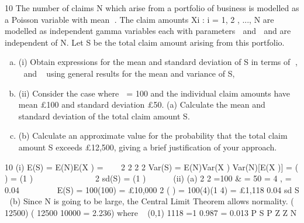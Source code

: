 \item 10 The number of claims N which arise from a portfolio of business is modelled as a
Poisson variable with mean . The claim amounts Xi : i = 1, 2 , ..., N are modelled as
independent gamma variables each with parameters  and  and are independent of
N. Let S be the total claim amount arising from this portfolio.
\begin{enumerate}[(a)]

\item (i) Obtain expressions for the mean and standard deviation of S in terms of , 
and using general results for the mean and variance of S, 
\item (ii) Consider the case where  = 100 and the individual claim amounts have mean
£100 and standard deviation £50.
(a) Calculate the mean and standard deviation of the total claim amount S.
\item (b) Calculate an approximate value for the probability that the total claim
amount S exceeds £12,500, giving a brief justification of your
approach. 
\end{enumerate}
10 (i) E(S) = E(N)E(X ) = 


2 2
2 2 Var(S) = E(N)Var(X ) Var(N)[E(X )] = ( ) = (1 )   
    
  
2
sd(S) = (1 )  


(ii) (a) 2
2 =100 & = 50 = 4 , = 0.04  
  
 
E(S) = 100(100) = £10,000
2
( ) = 100(4)(1 4) = £1,118
0.04
sd S 
(b) Since N is going to be large, the Central Limit Theorem allows
normality.
( 12500) ( 12500 10000 = 2.236) where ~ (0,1)
1118
=1 0.987 = 0.013
P S P Z Z N 
  

